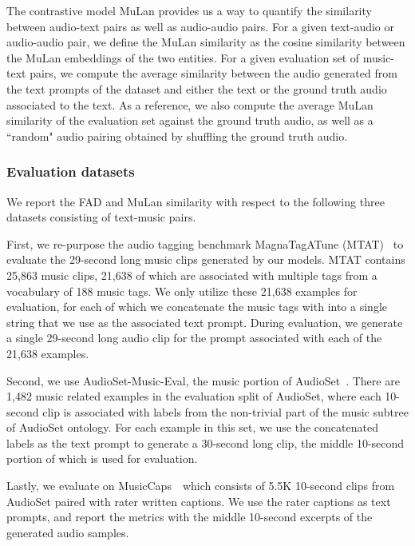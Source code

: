 \documentclass[nohyperref]{article}
\newcommand{\EvalSet}{MusicCaps~\cite{musiclm2023}}
\theoremstyle{plain}
\theoremstyle{definition}
\theoremstyle{remark}
\begin{document}
The contrastive model MuLan provides us a way to quantify the similarity between audio-text pairs as well as audio-audio pairs. For a given text-audio or audio-audio pair, we define the MuLan similarity as the cosine similarity between the MuLan embeddings of the two entities. For a given evaluation set of music-text pairs, we compute the average similarity between the audio generated from the text prompts of the dataset and either the text or the ground truth audio associated to the text.
As a reference, we also compute the average MuLan similarity of the evaluation set against the ground truth audio, as well as a ``random" audio pairing obtained by shuffling the ground truth audio.

\subsubsection{Evaluation datasets}

We report the FAD and MuLan similarity with respect to the following three datasets consisting of text-music pairs.

First, we re-purpose the audio tagging benchmark MagnaTagATune (MTAT)~\cite{law2009evaluation} to evaluate the 29-second long music clips generated by our models.
MTAT contains 25,863 music clips, 21,638 of which are associated with multiple tags from a vocabulary of 188 music tags. We only utilize these 21,638 examples for evaluation, for each of which we concatenate the music tags with into a single string that we use as the associated text prompt. During evaluation, we generate a single 29-second long audio clip for the prompt associated with each of the 21,638 examples.

Second, we use AudioSet-Music-Eval, the music portion of AudioSet~\cite{gemmeke2017audio}. There are 1,482 music related examples in the evaluation split of AudioSet, where each 10-second clip is associated with labels from the non-trivial part of the music subtree of AudioSet ontology. For each example in this set, we use the concatenated labels as the text prompt to generate a 30-second long clip, the middle 10-second portion of which is used for evaluation. 

Lastly, we evaluate on \EvalSet~which consists of 5.5K 10-second clips from AudioSet paired with rater written captions. We use the rater captions as text prompts, and report the metrics with the middle 10-second excerpts of the generated audio samples.
\end{document}
